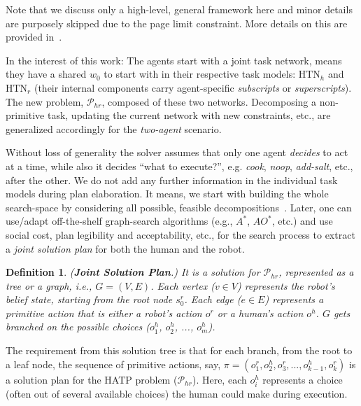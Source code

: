 \documentclass[letterpaper]{article} %
\newtheorem{definition}{Definition}
\begin{document}
Note that we discuss only a high-level, general framework here and minor details are purposely skipped due to the page limit constraint. More details on this are provided in~\cite{thesisBuisan21,buisan:hal-03684211}. 

In the interest of this work: The agents start with a joint task network, means they have a shared $w_0$ to start with in their respective task models: $\mathrm{HTN}_{h}$ and $\mathrm{HTN}_{r}$ (their internal components carry agent-specific \textit{subscripts} or \textit{superscripts}). The new problem, $\mathcal{P}_{hr}$, composed of these two networks. Decomposing a non-primitive task, updating the current network with new constraints, etc., are generalized accordingly for the \textit{two-agent} scenario. 

Without loss of generality the solver assumes that only one agent \textit{decides} to act at a time, while also it decides ``what to execute?'', e.g. \textit{cook}, \textit{noop}, \textit{add-salt}, etc., after the other.
We do not add any further information in the individual task models during plan elaboration. It means, we start with building the whole search-space by considering all possible, feasible decompositions~\cite{buisan:hal-03684211}. Later, one can use/adapt off-the-shelf graph-search algorithms (e.g., $A^*$, $AO^*$, etc.) and use social cost, plan legibility and acceptability, etc., for the search process to extract a \textit{joint solution plan} for both the human and the robot. 

\begin{definition}
(\textbf{Joint Solution Plan}.) 
{It is a solution for $\mathcal{P}_{hr}$, represented as a tree or a graph, i.e., $G=(V,E)$. Each vertex ($v \in V$) represents the robot's belief state, starting from the root node $s_0^r$. Each edge ($e \in E$) represents a primitive action that is either a robot's action $o^{r}$ or a human's action $o^{h}$. $G$ gets branched on the possible choices ($o^{h}_1$, $o^{h}_2$, ..., $o^{h}_m$). 
}  
\end{definition}

The requirement from this solution tree is that for each branch, from the root to a leaf node, the sequence of primitive actions, say,  $\pi=(o_1^r,o_2^h,o_3^r,...,o_{k-1}^h,o_k^r)$ is a solution plan for the HATP problem ($\mathcal{P}_{hr}$). Here, each $o_i^h$ represents a choice (often out of several available choices) the human could make during execution.
\end{document}
